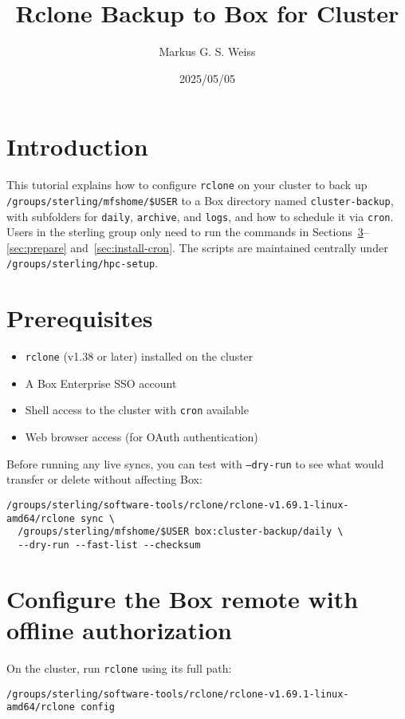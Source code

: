 \documentclass[12pt,letterpaper]{article}
\title{\LARGE Rclone Backup to Box for Cluster}
\author{Markus G. S. Weiss}
\date{2025/05/05}
\begin{document}
\maketitle

\tableofcontents
\newpage

\section{Introduction}
This tutorial explains how to configure \texttt{rclone} on your cluster to back up
\texttt{/groups/sterling/mfshome/\$USER} to a Box directory named \texttt{cluster-backup},
with subfolders for \texttt{daily}, \texttt{archive}, and \texttt{logs}, and how to
schedule it via \texttt{cron}. Users in the sterling group only need to run the commands in
Sections~\ref{sec:configure}--\ref{sec:prepare} and~\ref{sec:install-cron}. The scripts are
maintained centrally under \verb|/groups/sterling/hpc-setup|.

\section{Prerequisites}
\begin{itemize}
  \item \texttt{rclone} (v1.38 or later) installed on the cluster
  \item A Box Enterprise SSO account
  \item Shell access to the cluster with \texttt{cron} available
  \item Web browser access (for OAuth authentication)
\end{itemize}

\begin{tcolorbox}[title=Tip]
Before running any live syncs, you can test with \texttt{--dry-run} to see what would transfer
or delete without affecting Box:
\begin{lstlisting}[style=custombash]
/groups/sterling/software-tools/rclone/rclone-v1.69.1-linux-amd64/rclone sync \
  /groups/sterling/mfshome/$USER box:cluster-backup/daily \
  --dry-run --fast-list --checksum
\end{lstlisting}
\end{tcolorbox}

\section{Configure the Box remote with offline authorization}
\label{sec:configure}
On the cluster, run \texttt{rclone} using its full path:
\begin{lstlisting}[style=custombash]
/groups/sterling/software-tools/rclone/rclone-v1.69.1-linux-amd64/rclone config
\end{lstlisting}
\end{document}
